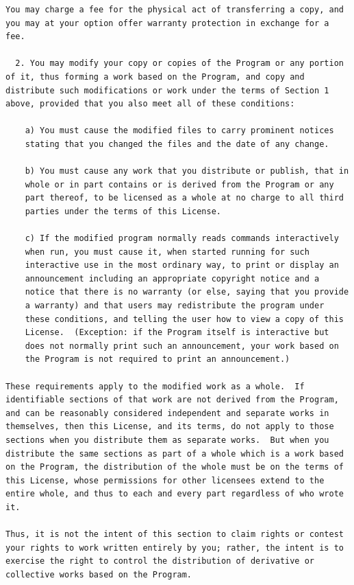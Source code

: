 \documentclass[a4paper,BCOR30mm,DIV14,pdftex,liststotoc,footsepline,openany]{scrbook}
\begin{document}
\begin{verbatim}
You may charge a fee for the physical act of transferring a copy, and
you may at your option offer warranty protection in exchange for a fee.

  2. You may modify your copy or copies of the Program or any portion
of it, thus forming a work based on the Program, and copy and
distribute such modifications or work under the terms of Section 1
above, provided that you also meet all of these conditions:

    a) You must cause the modified files to carry prominent notices
    stating that you changed the files and the date of any change.

    b) You must cause any work that you distribute or publish, that in
    whole or in part contains or is derived from the Program or any
    part thereof, to be licensed as a whole at no charge to all third
    parties under the terms of this License.

    c) If the modified program normally reads commands interactively
    when run, you must cause it, when started running for such
    interactive use in the most ordinary way, to print or display an
    announcement including an appropriate copyright notice and a
    notice that there is no warranty (or else, saying that you provide
    a warranty) and that users may redistribute the program under
    these conditions, and telling the user how to view a copy of this
    License.  (Exception: if the Program itself is interactive but
    does not normally print such an announcement, your work based on
    the Program is not required to print an announcement.)

These requirements apply to the modified work as a whole.  If
identifiable sections of that work are not derived from the Program,
and can be reasonably considered independent and separate works in
themselves, then this License, and its terms, do not apply to those
sections when you distribute them as separate works.  But when you
distribute the same sections as part of a whole which is a work based
on the Program, the distribution of the whole must be on the terms of
this License, whose permissions for other licensees extend to the
entire whole, and thus to each and every part regardless of who wrote it.

Thus, it is not the intent of this section to claim rights or contest
your rights to work written entirely by you; rather, the intent is to
exercise the right to control the distribution of derivative or
collective works based on the Program.


\end{verbatim}
\end{document}
